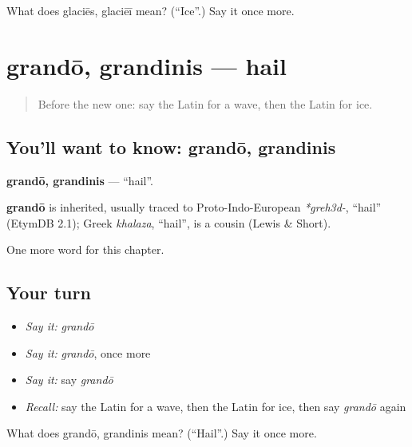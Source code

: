 \begin{tcolorbox}[breakable,colback=teal!4,colframe=teal!35!black,title={Before you move on}]
What does glaciēs, glaciēī mean? (\textquotedblleft{}Ice\textquotedblright{}.) Say it once more.
\end{tcolorbox}
\section[grandō, grandinis]{grandō, grandinis — hail}

\label{lesson:LA-C130-grando}



\begin{quote}
Before the new one: say the Latin for a wave, then the Latin for ice.
\end{quote}

\subsection*{You'll want to know: grandō, grandinis}
\textbf{grandō, grandinis} — \textquotedblleft{}hail\textquotedblright{}.

\begin{cousinweb}
\textbf{grandō} is inherited, usually traced to Proto-Indo-European \emph{*greh3d-}, \textquotedblleft{}hail\textquotedblright{} (EtymDB 2.1); Greek \emph{khalaza}, \textquotedblleft{}hail\textquotedblright{}, is a cousin (Lewis \& Short).
\end{cousinweb}

\begin{grammarlens}[title={What you've built}]
One more word for this chapter.
\end{grammarlens}

\subsection*{Your turn}
\begin{itemize}
\raggedright
  \item \emph{Say it:} \emph{grandō}
  \item \emph{Say it:} \emph{grandō}, once more
  \item \emph{Say it:} say \emph{grandō}
  \item \emph{Recall:} say the Latin for a wave, then the Latin for ice, then say \emph{grandō} again
\end{itemize}

\begin{tcolorbox}[breakable,colback=teal!4,colframe=teal!35!black,title={Before you move on}]
What does grandō, grandinis mean? (\textquotedblleft{}Hail\textquotedblright{}.) Say it once more.
\end{tcolorbox}

